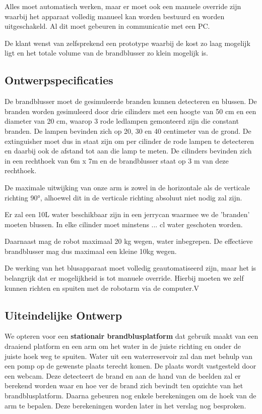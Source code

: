 \documentclass[kulak]{kulakarticle} %
\begin{document}
		Alles moet automatisch werken, maar er moet ook een manuele override zijn waarbij het apparaat volledig manueel kan worden bestuurd en worden uitgeschakeld. Al dit moet gebeuren in communicatie met een PC. 
		
		De klant wenst van zelfsprekend een prototype waarbij de kost zo laag mogelijk ligt en het totale volume van de brandblusser zo klein mogelijk is.



	\subsection{Ontwerpspecificaties}

		De brandblusser moet de gesimuleerde branden kunnen detecteren en blussen. De branden worden gesimuleerd door drie cilinders met een hoogte van 50 cm en een diameter van 20 cm, waarop 3 rode ledlampen gemonteerd zijn die constant branden. De lampen bevinden zich op 20, 30 en 40 centimeter van de grond. De extinguisher moet dus in staat zijn om per cilinder de rode lampen te detecteren en daarbij ook de afstand tot aan die lamp te meten. De cilinders bevinden zich in een rechthoek van 6m x 7m en de brandblusser staat op 3 m van deze rechthoek.
		
		De maximale uitwijking van onze arm is zowel in de horizontale als de verticale richting 90°, alhoewel dit in de verticale richting absoluut niet nodig zal zijn.
		
		Er zal een 10L water beschikbaar zijn in een jerrycan waarmee we de 'branden' moeten blussen. In elke cilinder moet minstens ... cl water geschoten worden.
		
		Daarnaast mag de robot maximaal 20 kg wegen, water inbegrepen. De effectieve brandblusser mag dus maximaal een kleine 10kg wegen.
		
		De werking van het blusapparaat moet volledig geautomatiseerd zijn, maar het is belangrijk dat er mogelijkheid is tot manuele override. Hierbij moeten we zelf kunnen richten en spuiten met de robotarm via de computer.V
	

	\subsection{Uiteindelijke Ontwerp}

		We opteren voor een \textbf{stationair brandblusplatform} dat gebruik maakt van een draaiend platform en een arm om het water in de juiste richting en onder de juiste hoek weg te spuiten.  Water uit een waterreservoir zal dan met behulp van een pomp op de gewenste plaats terecht komen. De plaats wordt vastgesteld door een webcam. Deze detecteert de brand en aan de hand van de beelden zal er berekend worden waar en hoe ver de brand zich bevindt ten opzichte van het brandblusplatform. Daarna gebeuren nog enkele berekeningen om de hoek van de arm te bepalen. Deze berekeningen worden later in het verslag nog besproken. \\
		
\end{document}
